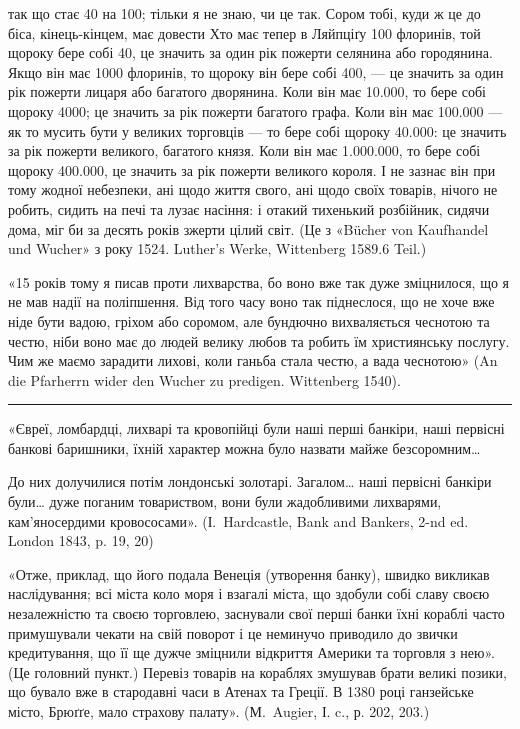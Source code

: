 \parcont{}  %
так що стає 40 на 100; тільки я не знаю, чи це так. Сором тобі, куди ж це
до біса, кінець-кінцем, має довести Хто має тепер в Ляйпціґу 100 флоринів,
той щороку бере собі 40, це значить за один рік пожерти селянина або городянина.
Якщо він має 1000 флоринів, то щороку він бере собі 400, — це значить
за один рік пожерти лицаря або багатого дворянина. Коли він має \num{10.000}, то
бере собі щороку 4000; це значить за рік пожерти багатого графа. Коли він
має \num{100.000} — як то мусить бути у великих торговців — то бере собі щороку
\num{40.000}: це значить за рік пожерти великого, багатого князя. Коли він має
\num{1.000.000}, то бере собі щороку \num{400.000}, це значить за рік пожерти великого
короля. І не зазнає він при тому жодної небезпеки, ані щодо життя свого, ані
щодо своїх товарів, нічого не робить, сидить на печі та лузає насіння: і отакий
тихенький розбійник, сидячи дома, міг би за десять років зжерти цілий світ.
(Це з «Bücher von Kaufhandel und Wucher» з року 1524. Luther’s Werke, Wittenberg
1589.6 Teil.)

«15 років тому я писав проти лихварства, бо воно вже так дуже зміцнилося,
що я не мав надії на поліпшення. Від того часу воно так піднеслося, що
не хоче вже ніде бути вадою, гріхом або соромом, але бундючно вихваляється
чеснотою та честю, ніби воно має до людей велику любов та робить їм християнську
послугу. Чим же маємо зарадити лихові, коли ганьба стала честю, а
вада чеснотою» (An die Pfarherrn wider den Wucher zu predigen. Wittenberg 1540).

\pfbreak

«Євреї, ломбардці, лихварі та кровопійці були наші перші банкіри, наші
первісні банкові баришники, їхній характер можна було назвати майже безсоромним\dots{}

До них долучилися потім лондонські золотарі. Загалом\dots{} наші первісні
банкіри були\dots{} дуже поганим товариством, вони були жадобливими лихварями,
кам’яносердими кровососами». (І.~Hardcastle, Bank and Bankers, 2-nd ed. London
1843, p. 19, 20)

«Отже, приклад, що його подала Венеція (утворення банку), швидко викликав
наслідування; всі міста коло моря і взагалі міста, що здобули собі
славу своєю незалежністю та своєю торговлею, заснували свої перші банки
їхні кораблі часто примушували чекати на свій поворот і це неминучо приводило
до звички кредитування, що її ще дужче зміцнили відкриття Америки та
торговля з нею». (Це головний пункт.) Перевіз товарів на кораблях змушував
брати великі позики, що бувало вже в стародавні часи в Атенах та Греції.
В 1380 році ганзейське місто, Брюґґе, мало страхову палату». (М.~Augier, І. c., р.
202, 203.)

